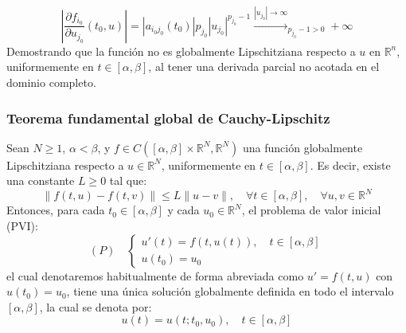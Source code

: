 {\begin{enumerate}
        \[
            \left| \frac{\partial f_{i_0}}{\partial u_{j_0}}(t_0,u) \right| = |a_{i_0 j_0}(t_0)| p_{j_0} |u_{j_0}|^{p_{j_0} - 1} \xrightarrow{|u_{j_0}| \to \infty}_{p_{j_0} - 1 > 0} +\infty
        \]
        Demostrando que la función no es globalmente Lipschitziana respecto a $u$ en $\mathbb{R}^n$, uniformemente en $t \in [\alpha, \beta]$, al tener una derivada parcial no acotada en el dominio completo.
    \end{enumerate}
}

\subsubsection{Teorema fundamental global de Cauchy-Lipschitz}

\begin{teorema}
    Sean $N \geq 1$, $\alpha < \beta$, y $f \in C([\alpha, \beta] \times \mathbb{R}^N, \mathbb{R}^N)$ una función globalmente Lipschitziana respecto a $u \in \mathbb{R}^N$, uniformemente en $t \in [\alpha, \beta]$. Es decir, existe una constante $L \geq 0$ tal que:
    \[
        \| f(t,u) - f(t,v) \| \leq L \| u - v \|, \quad \forall t \in [\alpha, \beta], \quad \forall u, v \in \mathbb{R}^N
    \]
    Entonces, para cada $t_0 \in [\alpha, \beta]$ y cada $u_0 \in \mathbb{R}^N$, el problema de valor inicial (PVI):
    \[
        (P) \quad
        \begin{cases}
            u'(t) = f(t, u(t)), \quad t \in [\alpha, \beta] \\
            u(t_0) = u_0
        \end{cases}
    \]
    el cual denotaremos habitualmente de forma abreviada como $u' = f(t,u)$ con $u(t_0) = u_0$, tiene una única solución globalmente definida en todo el intervalo $[\alpha, \beta]$, la cual se denota por:
    \[
        u(t) = u(t; t_0, u_0), \quad t \in [\alpha, \beta]
    \]
\end{teorema}

